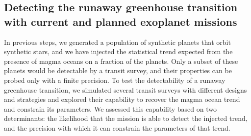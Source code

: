 \documentclass[modern]{aastex631}
\begin{document}
\subsection{Detecting the runaway greenhouse transition with current and planned exoplanet missions}
In previous steps, we generated a population of synthetic planets that orbit synthetic stars, and we have injected the statistical trend expected from the presence of magma oceans on a fraction of the planets.
Only a subset of these planets would be detectable by a transit survey, and their properties can be probed only with a finite precision.
To test the detectability of a runaway greenhouse transition, we simulated several transit surveys with different designs and strategies and explored their capability to recover the magma ocean trend and constrain its parameters.
We assessed this capability based on two determinants: the likelihood that the mission is able to detect the injected trend, and the precision with which it can constrain the parameters of that trend.
\end{document}
